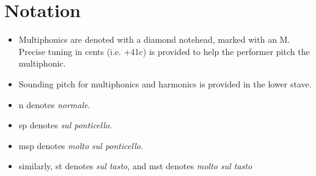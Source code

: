 \section*{Notation}
\begin{itemize}

    \item Multiphonics are denoted with a diamond notehead, marked with an M. Precise tuning in cents (i.e. +41c) is provided to help the performer pitch the multiphonic.
    \item Sounding pitch for multiphonics and harmonics is provided in the lower stave.
    \item n denotes \emph{normale}.
    \item sp denotes \emph{sul ponticello}.
    \item msp denotes \emph{molto sul ponticello}.
    \item similarly, st denotes \emph{sul tasto}, and mst denotes \emph{molto sul tasto}
\end{itemize}

\newpage\label{app:celloPiece Score}
